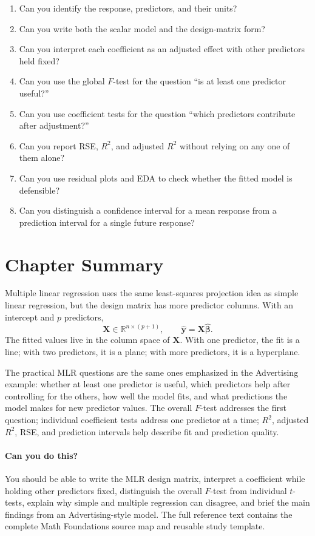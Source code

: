 {\begin{enumerate}
  \item Can you identify the response, predictors, and their units?
  \item Can you write both the scalar model and the design-matrix form?
  \item Can you interpret each coefficient as an adjusted effect with other predictors held fixed?
  \item Can you use the global \(F\)-test for the question ``is at least one predictor useful?''
  \item Can you use coefficient tests for the question ``which predictors contribute after adjustment?''
  \item Can you report RSE, \(R^2\), and adjusted \(R^2\) without relying on any one of them alone?
  \item Can you use residual plots and EDA to check whether the fitted model is defensible?
  \item Can you distinguish a confidence interval for a mean response from a prediction interval for a single future response?
\end{enumerate}
}{
\section{Chapter Summary}

Multiple linear regression uses the same least-squares projection idea as simple linear regression, but the design matrix has more predictor columns.  With an intercept and \(p\) predictors,
\begin{equation}
  \mathbf{X}\in\mathbb{R}^{n\times(p+1)},
  \qquad
  \widehat{\mathbf{y}}=\mathbf{X}\widehat{\boldsymbol{\beta}}.
\end{equation}
The fitted values live in the column space of \(\mathbf{X}\).  With one predictor, the fit is a line; with two predictors, it is a plane; with more predictors, it is a hyperplane.

The practical MLR questions are the same ones emphasized in the Advertising example: whether at least one predictor is useful, which predictors help after controlling for the others, how well the model fits, and what predictions the model makes for new predictor values.  The overall \(F\)-test addresses the first question; individual coefficient tests address one predictor at a time; \(R^2\), adjusted \(R^2\), RSE, and prediction intervals help describe fit and prediction quality.

\paragraph{Can you do this?}
You should be able to write the MLR design matrix, interpret a coefficient while holding other predictors fixed, distinguish the overall \(F\)-test from individual \(t\)-tests, explain why simple and multiple regression can disagree, and brief the main findings from an Advertising-style model.  The full reference text contains the complete Math Foundations source map and reusable study template.
}
